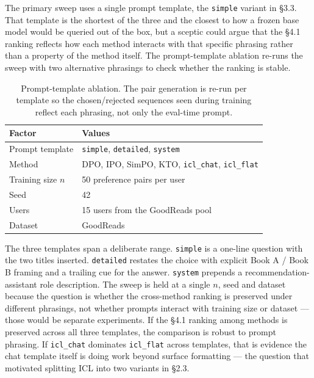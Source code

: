 The primary sweep uses a single prompt template, the \texttt{simple} variant in \S3.3. That template is the shortest of the three and the closest to how a frozen base model would be queried out of the box, but a sceptic could argue that the \S4.1 ranking reflects how each method interacts with that specific phrasing rather than a property of the method itself. The prompt-template ablation re-runs the sweep with two alternative phrasings to check whether the ranking is stable.

\begin{table}[h]
\centering
\caption{Prompt-template ablation. The pair generation is re-run per template so the chosen/rejected sequences seen during training reflect each phrasing, not only the eval-time prompt.}
\label{tab:prompt_grid}
\begin{tabular}{ll}
\toprule
\textbf{Factor} & \textbf{Values} \\
\midrule
Prompt template   & \texttt{simple}, \texttt{detailed}, \texttt{system} \\
Method            & DPO, IPO, SimPO, KTO, \texttt{icl\_chat}, \texttt{icl\_flat} \\
Training size $n$ & 50 preference pairs per user \\
Seed              & 42 \\
Users             & 15 users from the GoodReads pool \\
Dataset           & GoodReads \\
\bottomrule
\end{tabular}
\end{table}

The three templates span a deliberate range. \texttt{simple} is a one-line question with the two titles inserted. \texttt{detailed} restates the choice with explicit Book A / Book B framing and a trailing cue for the answer. \texttt{system} prepends a recommendation-assistant role description. The sweep is held at a single $n$, seed and dataset because the question is whether the cross-method ranking is preserved under different phrasings, not whether prompts interact with training size or dataset --- those would be separate experiments. If the \S4.1 ranking among methods is preserved across all three templates, the comparison is robust to prompt phrasing. If \texttt{icl\_chat} dominates \texttt{icl\_flat} across templates, that is evidence the chat template itself is doing work beyond surface formatting --- the question that motivated splitting ICL into two variants in \S2.3.


